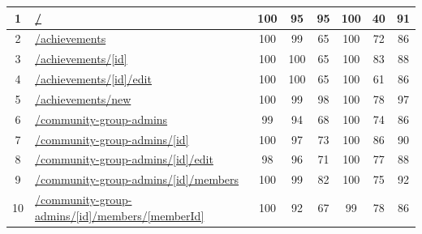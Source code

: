 \begin{longtable}{|c|p{5cm}|c|c|c|c|c|c|}
      1                                        & \url{/}                                                    & 100              & 95               & 95               & 100              & 40               & 91            \\
      \hline
      2                                        & \url{/achievements}                                        & 100              & 99               & 65               & 100              & 72               & 86            \\
      \hline
      3                                        & \url{/achievements/[id]}                                   & 100              & 100              & 65               & 100              & 83               & 88            \\
      \hline
      4                                        & \url{/achievements/[id]/edit}                              & 100              & 100              & 65               & 100              & 61               & 86            \\
      \hline
      5                                        & \url{/achievements/new}                                    & 100              & 99               & 98               & 100              & 78               & 97            \\
      \hline
      6                                        & \url{/community-group-admins}                              & 99               & 94               & 68               & 100              & 74               & 86            \\
      \hline
      7                                        & \url{/community-group-admins/[id]}                         & 100              & 97               & 73               & 100              & 86               & 90            \\
      \hline
      8                                        & \url{/community-group-admins/[id]/edit}                    & 98               & 96               & 71               & 100              & 77               & 88            \\
      \hline
      9                                        & \url{/community-group-admins/[id]/members}                 & 100              & 99               & 82               & 100              & 75               & 92            \\
      \hline
      10                                       & \url{/community-group-admins/[id]/members/[memberId]}      & 100              & 92               & 67               & 99               & 78               & 86            \\

\end{longtable}
